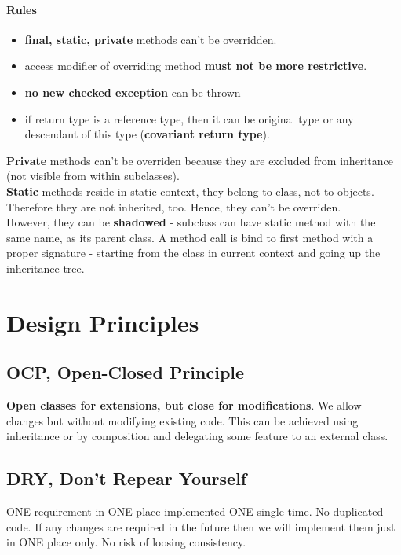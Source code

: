 \documentclass{report}
\begin{document}
\subsection*{Rules}
\begin{itemize}
	\item \textbf{final, static, private} methods can't be overridden.
	\item access modifier of overriding method \textbf{must not be more restrictive}.
	\item \textbf{no new checked exception} can be thrown
	\item if return type is a reference type, then it can be original type or any descendant of this type (\textbf{covariant return type}).
\end{itemize}

\textbf{Private} methods can't be overriden because they are excluded from inheritance (not visible from within subclasses). \\
\textbf{Static} methods reside in static context, they belong to class, not to objects. Therefore they are not inherited, too. Hence, they can't be overriden. \\
However, they can be \textbf{shadowed} - subclass can have static method with the same name, as its parent class. A method call is bind to first method with a proper signature - starting 
from the class in current context and going up the inheritance tree.




\part{Design Principles}



\chapter{OCP, Open-Closed Principle}
\textbf{Open classes for extensions, but close for modifications}.
We allow changes but without modifying existing code. This can be achieved
using inheritance or by composition and delegating some feature to an external class.



\chapter{DRY, Don't Repear Yourself}
ONE requirement in ONE place implemented ONE single time. No duplicated code.
If any changes are required in the future then we will implement them
just in ONE place only. No risk of loosing consistency.
\end{document}
